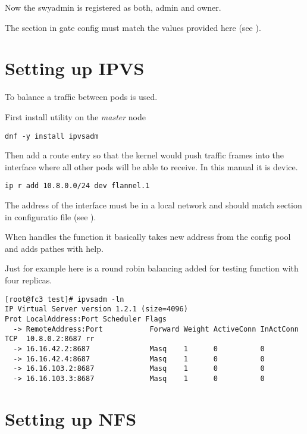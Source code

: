 Now the swyadmin is registered as both, admin and owner.

The  section in gate config must match the values
provided here (see ).

\section{Setting up IPVS}
\label{sec:setup-nfs}

To balance a traffic between pods
 is used.

First install  utility on the \emph{master} node

\begin{lstlisting}
dnf -y install ipvsadm
\end{lstlisting}

Then add a route entry so that the kernel would push traffic
frames into the interface where all other pods will be able
to receive. In this manual it is  device.

\begin{lstlisting}
ip r add 10.8.0.0/24 dev flannel.1
\end{lstlisting}

The address of the interface must be in a local network and
should match  section in configuratio file
(see ).

When  handles the function it basically takes new
address from the config pool and adds pathes with 
help.

Just for example here is a round robin balancing added for
testing function with four replicas.

\begin{lstlisting}
[root@fc3 test]# ipvsadm -ln
IP Virtual Server version 1.2.1 (size=4096)
Prot LocalAddress:Port Scheduler Flags
  -> RemoteAddress:Port           Forward Weight ActiveConn InActConn
TCP  10.8.0.2:8687 rr
  -> 16.16.42.2:8687              Masq    1      0          0         
  -> 16.16.42.4:8687              Masq    1      0          0         
  -> 16.16.103.2:8687             Masq    1      0          0         
  -> 16.16.103.3:8687             Masq    1      0          0         
\end{lstlisting}

\section{Setting up NFS}
\label{sec:setup-nfs}


